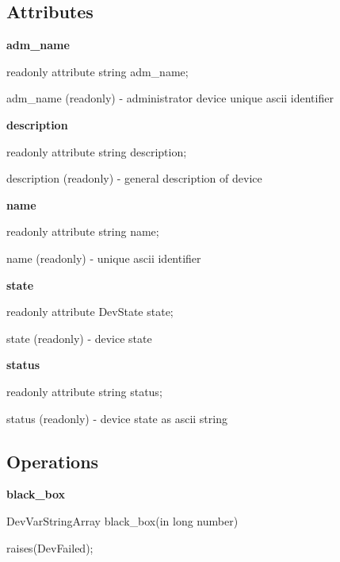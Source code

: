 \subsection{Attributes}

\textbf{adm\_name}

readonly attribute string adm\_name;

adm\_name (readonly) - administrator device unique ascii identifier\\


\begin{flushleft}
\textbf{description}
\par\end{flushleft}

readonly attribute string description;

description (readonly) - general description of device\\


\begin{flushleft}
\textbf{name}
\par\end{flushleft}

readonly attribute string name;

name (readonly) - unique ascii identifier\\


\begin{flushleft}
\textbf{state}
\par\end{flushleft}

readonly attribute DevState state;

state (readonly) - device state\\


\begin{flushleft}
\textbf{status}
\par\end{flushleft}

readonly attribute string status;

status (readonly) - device state as ascii string


\subsection{Operations}

\textbf{black\_box}

DevVarStringArray black\_box(in long number)

raises(DevFailed);\\


